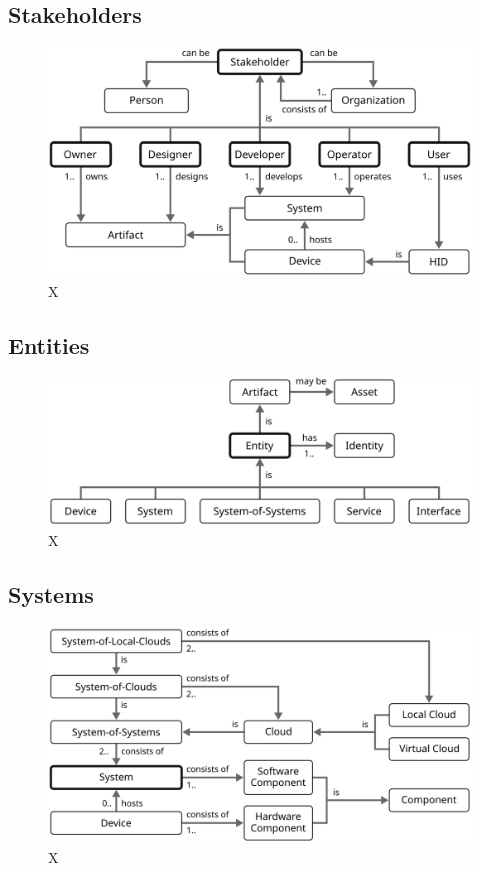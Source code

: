 \subsection{Stakeholders}

\begin{figure}[ht!]
  \centering
  \includegraphics{figures/stakeholder-roles}
  \caption{
    X
  }
  \label{fig:stakeholder-roles}
\end{figure}

\subsection{Entities}

\begin{figure}[ht!]
  \centering
  \includegraphics{figures/entity-classes}
  \caption{
    X
  }
  \label{fig:entity-classes}
\end{figure}

\subsection{Systems}

\begin{figure}[ht!]
  \centering
  \includegraphics{figures/system-composition}
  \caption{
    X
  }
  \label{fig:system-composition}
\end{figure}

